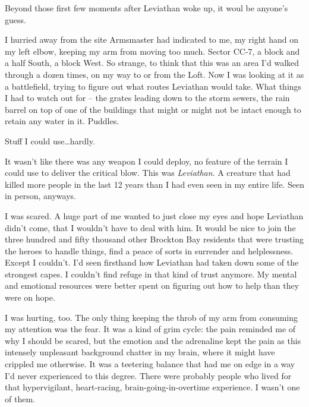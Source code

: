 Beyond those first few moments after Leviathan woke up, it woul be anyone's guess.



I hurried away from the site Armsmaster had indicated to me, my right hand on my left elbow, keeping my arm from moving too much.  Sector CC-7, a block and a half South, a block West.  So strange, to think that this was an area I'd walked through a dozen times, on my way to or from the Loft.  Now I was looking at it as a battlefield, trying to figure out what routes Leviathan would take.  What things I had to watch out for – the grates leading down to the storm sewers, the rain barrel on top of one of the buildings that might or might not be intact enough to retain any water in it.  Puddles.



Stuff I could use\ldots  hardly.



It wasn't like there was any weapon I could deploy, no feature of the terrain I could use to deliver the critical blow.  This was \emph{Leviathan}.  A creature that had killed more people in the last 12 years than I had even seen in my entire life.  Seen in person, anyways.



I was scared.  A huge part of me wanted to just close my eyes and hope Leviathan didn't come, that I wouldn't have to deal with him.  It would be nice to join the three hundred and fifty thousand other Brockton Bay residents that were trusting the heroes to handle things, find a peace of sorts in surrender and helplessness.  Except I couldn't.  I'd seen firsthand how Leviathan had taken down some of the strongest capes.  I couldn't find refuge in that kind of trust anymore.  My mental and emotional resources were better spent on figuring out how to help than they were on hope.



I was hurting, too.  The only thing keeping the throb of my arm from consuming my attention was the fear.  It was a kind of grim cycle:  the pain reminded me of why I should be scared, but the emotion and the adrenaline kept the pain as this intensely unpleasant background chatter in my brain, where it might have crippled me otherwise.  It was a teetering balance that had me on edge in a way I'd never experienced to this degree.  There were probably people who lived for that hypervigilant, heart-racing, brain-going-in-overtime experience.  I wasn't one of them.



